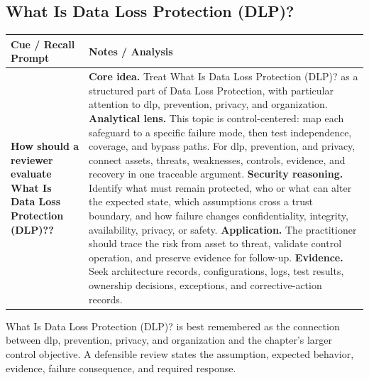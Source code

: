 \documentclass[11pt]{article}
\newcommand{\CornellHeader}{%
\rowcolor{Navy}\color{white}\bfseries Cue / Recall Prompt & \color{white}\bfseries Notes / Analysis\\\hline}
\newcommand{\CornellRow}[2]{%
\cellcolor{CueGray}\RaggedRight\textbf{#1} & \RaggedRight #2\\\hline}
\begin{document}
\subsection*{What Is Data Loss Protection (DLP)?}
\begin{longtable}{>{\RaggedRight\arraybackslash}p{}|>{\RaggedRight\arraybackslash}p{}}
\CornellHeader
\CornellRow{How should a reviewer evaluate What Is Data Loss Protection (DLP)??}{\textbf{Core idea.} Treat What Is Data Loss Protection (DLP)? as a structured part of Data Loss Protection, with particular attention to dlp, prevention, privacy, and organization. \textbf{Analytical lens.} This topic is control-centered: map each safeguard to a specific failure mode, then test independence, coverage, and bypass paths. For dlp, prevention, and privacy, connect assets, threats, weaknesses, controls, evidence, and recovery in one traceable argument. \textbf{Security reasoning.} Identify what must remain protected, who or what can alter the expected state, which assumptions cross a trust boundary, and how failure changes confidentiality, integrity, availability, privacy, or safety. \textbf{Application.} The practitioner should trace the risk from asset to threat, validate control operation, and preserve evidence for follow-up. \textbf{Evidence.} Seek architecture records, configurations, logs, test results, ownership decisions, exceptions, and corrective-action records.}
\end{longtable}
\begin{topicsummary}
What Is Data Loss Protection (DLP)? is best remembered as the connection between dlp, prevention, privacy, and organization and the chapter's larger control objective. A defensible review states the assumption, expected behavior, evidence, failure consequence, and required response.
\end{topicsummary}
\end{document}
